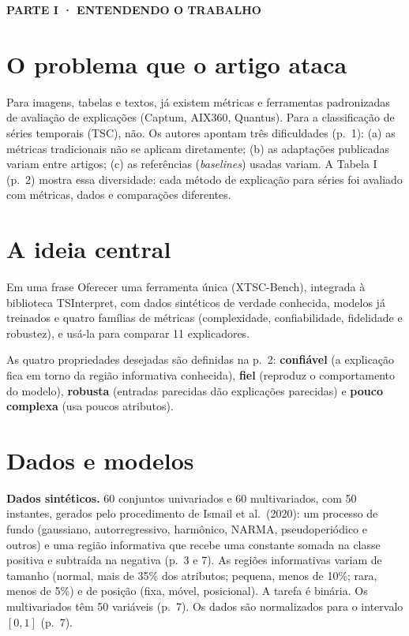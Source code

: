 \documentclass[11pt,a4paper]{article}
\newcommand{\partbar}[1]{\par\vspace{1.2em}\noindent\colorbox{black!80}{\parbox{\dimexpr\linewidth-2\fboxsep}{\color{white}\bfseries\sffamily\MakeUppercase{#1}}}\par\vspace{0.4em}}
\begin{document}
\partbar{Parte I · Entendendo o trabalho}

\section{O problema que o artigo ataca}
Para imagens, tabelas e textos, já existem métricas e ferramentas padronizadas de avaliação de explicações (Captum, AIX360, Quantus). Para a classificação de séries temporais (TSC), não. Os autores apontam três dificuldades (p.~1): (a) as métricas tradicionais não se aplicam diretamente; (b) as adaptações publicadas variam entre artigos; (c) as referências (\textit{baselines}) usadas variam. A Tabela I (p.~2) mostra essa diversidade: cada método de explicação para séries foi avaliado com métricas, dados e comparações diferentes.

\section{A ideia central}
\begin{infobox}[note]{Em uma frase}
Oferecer uma ferramenta única (XTSC-Bench), integrada à biblioteca TSInterpret, com dados sintéticos de verdade conhecida, modelos já treinados e quatro famílias de métricas (complexidade, confiabilidade, fidelidade e robustez), e usá-la para comparar 11 explicadores.
\end{infobox}
As quatro propriedades desejadas são definidas na p.~2: \textbf{confiável} (a explicação fica em torno da região informativa conhecida), \textbf{fiel} (reproduz o comportamento do modelo), \textbf{robusta} (entradas parecidas dão explicações parecidas) e \textbf{pouco complexa} (usa poucos atributos).

\section{Dados e modelos}
\textbf{Dados sintéticos.} 60 conjuntos univariados e 60 multivariados, com 50 instantes, gerados pelo procedimento de Ismail et al.\ (2020): um processo de fundo (gaussiano, autorregressivo, harmônico, NARMA, pseudoperiódico e outros) e uma região informativa que recebe uma constante somada na classe positiva e subtraída na negativa (p.~3 e 7). As regiões informativas variam de tamanho (normal, mais de 35\% dos atributos; pequena, menos de 10\%; rara, menos de 5\%) e de posição (fixa, móvel, posicional). A tarefa é binária. Os multivariados têm 50 variáveis (p.~7). Os dados são normalizados para o intervalo $[0, 1]$ (p.~7).
\end{document}
